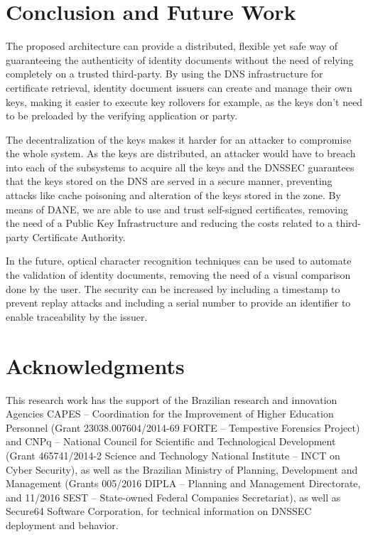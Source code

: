 \documentclass[12pt]{article}
\begin{document}
\section{Conclusion and Future Work}

The proposed architecture can provide a distributed, flexible yet safe way of guaranteeing the authenticity of identity documents without the need of relying completely on a trusted third-party. By using the DNS infrastructure for certificate retrieval, identity document issuers can create and manage their own keys, making it easier to execute key rollovers for example, as the keys don't need to be preloaded by the verifying application or party.

The decentralization of the keys makes it harder for an attacker to compromise the whole system. As the keys are distributed, an attacker would have to breach into each of the subsystems to acquire all the keys and the DNSSEC guarantees that the keys stored on the DNS are served in a secure manner, preventing attacks like cache poisoning and alteration of the keys stored in the zone. By means of DANE, we are able to use and trust self-signed certificates, removing the need of a Public Key Infrastructure and reducing the costs related to a third-party Certificate Authority.

In the future, optical character recognition techniques can be used to automate the validation of identity documents, removing the need of a visual comparison done by the user. The security can be increased by including a timestamp to prevent replay attacks and including a serial number to provide an identifier to enable traceability by the issuer.

\section*{Acknowledgments}
This research work has the support of the Brazilian research and innovation Agencies CAPES – Coordination for the Improvement of Higher Education Personnel (Grant 23038.007604/2014-69 FORTE – Tempestive Forensics Project) and CNPq – National Council for Scientific and Technological Development (Grant 465741/2014-2 Science and Technology National Institute – INCT on Cyber Security), as well as the Brazilian Ministry of Planning, Development and Management (Grants 005/2016 DIPLA – Planning and Management Directorate, and 11/2016 SEST – State-owned Federal Companies Secretariat), as well as Secure64 Software Corporation, for technical information on DNSSEC deployment and behavior.




\end{document}

